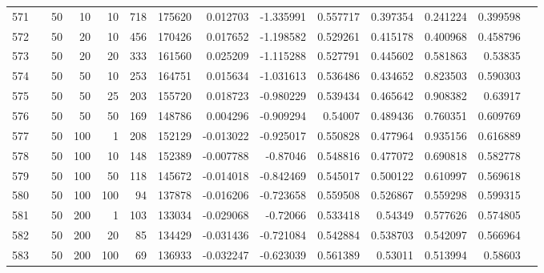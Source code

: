 \begin{longtable}{llrrrrrrrrrrrr}
		571 & &           50 &                10 &           10 &         718 &     175620 &  0.012703 & -1.335991 &  0.557717 &    0.397354 &       0.241224 &  0.399598 \\
		572 & \multirow[b]{10}{*}{\rotatebox[origin=l]{90}{use-default}} &           50 &                20 &           10 &         456 &     170426 &  0.017652 & -1.198582 &  0.529261 &    0.415178 &       0.400968 &  0.458796 \\
		573 & &           50 &                20 &           20 &         333 &     161560 &  0.025209 & -1.115288 &  0.527791 &    0.445602 &       0.581863 &   0.53835 \\
		574 & &           50 &                50 &           10 &         253 &     164751 &  0.015634 & -1.031613 &  0.536486 &    0.434652 &       0.823503 &  0.590303 \\
		575 & &           50 &                50 &           25 &         203 &     155720 &  0.018723 & -0.980229 &  0.539434 &    0.465642 &       0.908382 &   0.63917 \\
		576 & &           50 &                50 &           50 &         169 &     148786 &  0.004296 & -0.909294 &   0.54007 &    0.489436 &       0.760351 &  0.609769 \\
		577 & &           50 &               100 &            1 &         208 &     152129 & -0.013022 & -0.925017 &  0.550828 &    0.477964 &       0.935156 &  0.616889 \\
		578 & &           50 &               100 &           10 &         148 &     152389 & -0.007788 &  -0.87046 &  0.548816 &    0.477072 &       0.690818 &  0.582778 \\
		579 & &           50 &               100 &           50 &         118 &     145672 & -0.014018 & -0.842469 &  0.545017 &    0.500122 &       0.610997 &  0.569618 \\
		580 & &           50 &               100 &          100 &          94 &     137878 & -0.016206 & -0.723658 &  0.559508 &    0.526867 &       0.559298 &  0.599315 \\
		581 & &           50 &               200 &            1 &         103 &     133034 & -0.029068 &  -0.72066 &  0.533418 &     0.54349 &       0.577626 &  0.574805 \\
		582 & &           50 &               200 &           20 &          85 &     134429 & -0.031436 & -0.721084 &  0.542884 &    0.538703 &       0.542097 &  0.566964 \\
		583 & &           50 &               200 &          100 &          69 &     136933 & -0.032247 & -0.623039 &  0.561389 &     0.53011 &       0.513994 &   0.58603 \\

\end{longtable}
